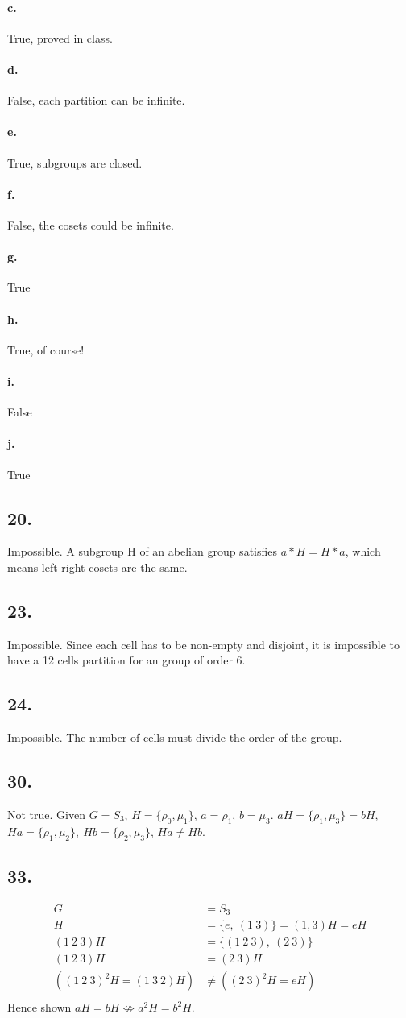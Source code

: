 \documentclass{article}
\begin{document}
\paragraph{c. }True, proved in class.
\paragraph{d. }False, each partition can be infinite.
\paragraph{e. }True, subgroups are closed.
\paragraph{f. }False, the cosets could be infinite.
\paragraph{g. }True
\paragraph{h. }True, of course!
\paragraph{i. }False
\paragraph{j. }True

\subsection*{20. }
Impossible. A subgroup H of an abelian group satisfies $a*H = H*a$, which means
left right cosets are the same.

\subsection*{23. }
Impossible. Since each cell has to be non-empty and disjoint, it is impossible
to have a 12 cells partition for an group of order 6.

\subsection*{24. }
Impossible. The number of cells must divide the order of the group.

\subsection*{30. }
Not true. Given $G=S_3$, $H=\{\rho_0,\mu_1\}$, $a = \rho_1$, $b = \mu_3$.
$aH=\{\rho_1,\mu_3\}=bH$, $Ha=\{\rho_1,\mu_2\},\ Hb=\{\rho_2,\mu_3\}$, $Ha
\neq Hb$.

\subsection*{33. }
\begin{align*}
G &= S_3 \\
H &= \{e,\ (1\ 3)\} = (1, 3)H = eH \\
(1\ 2\ 3)H &= \{(1\ 2\ 3),\ (2\ 3)\} \\
(1\ 2\ 3)H &= (2\ 3)H\\
\left((1\ 2\ 3)^2H = (1\ 3\ 2)H \right) &\neq \left((2\ 3)^2H = eH\right)\\
\end{align*}
Hence shown $aH = bH \not\Leftrightarrow a^2H = b^2H$.
\end{document}
